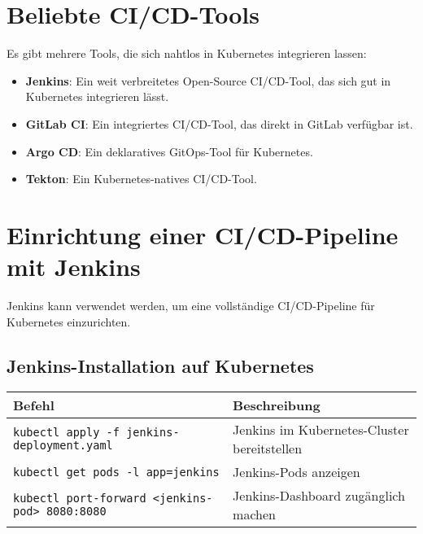 \section{Beliebte CI/CD-Tools}
Es gibt mehrere Tools, die sich nahtlos in Kubernetes integrieren lassen:
\begin{itemize}
    \item \textbf{Jenkins}: Ein weit verbreitetes Open-Source CI/CD-Tool, das sich gut in Kubernetes integrieren lässt.
    \item \textbf{GitLab CI}: Ein integriertes CI/CD-Tool, das direkt in GitLab verfügbar ist.
    \item \textbf{Argo CD}: Ein deklaratives GitOps-Tool für Kubernetes.
    \item \textbf{Tekton}: Ein Kubernetes-natives CI/CD-Tool.
\end{itemize}

\section{Einrichtung einer CI/CD-Pipeline mit Jenkins}
Jenkins kann verwendet werden, um eine vollständige CI/CD-Pipeline für Kubernetes einzurichten.

\subsection{Jenkins-Installation auf Kubernetes}
\noindent
\begin{tabular}{
|l|l|}
\hline
\textbf{Befehl} & \textbf{Beschreibung} \\
\hline
\texttt{kubectl apply -f jenkins-deployment.yaml} & Jenkins im Kubernetes-Cluster bereitstellen \\
\texttt{kubectl get pods -l app=jenkins} & Jenkins-Pods anzeigen \\
\texttt{kubectl port-forward <jenkins-pod> 8080:8080} & Jenkins-Dashboard zugänglich machen \\
\hline
\end{tabular}


